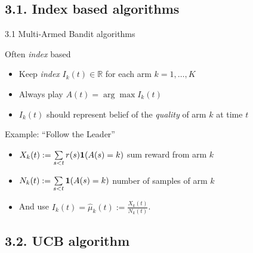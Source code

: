 \documentclass[12pt,english,ignorenonframetext,]{beamer}
\providecommand{\tightlist}{%
  \setlength{\itemsep}{0pt}\setlength{\parskip}{0pt}}
\begin{document}
\subsection{\hfill{}3.1.  Index based algorithms\hfill{}}

\begin{frame}{%
\protect\hypertarget{multi-armed-bandit-algorithms}{%
3.1 Multi-Armed Bandit algorithms}}

\begin{block}{Often \emph{index} based}

\begin{itemize}
\tightlist
\item
  Keep \emph{index} \(I_k(t) \in \mathbb{R}\) for each arm
  \(k=1,\ldots,K\)
\item
  Always play \(A(t) = \arg\max I_k(t)\)
\item
  \(I_k(t)\) should represent belief of the \emph{quality} of arm
  \(k\) at time \(t\)
\end{itemize}

\end{block}

\begin{block}{Example: ``Follow the Leader''}

\begin{itemize}
\tightlist
\item
  \(X_k(t) := \sum\limits_{s < t} r(s) \bold{1}(A(s)=k)\) sum reward
  from arm \(k\)
\item
  \(N_k(t) := \sum\limits_{s < t} \bold{1}(A(s)=k)\) number of samples
  of arm \(k\)
\item
  And use \(I_k(t) = \hat{\mu}_k(t) := \frac{X_k(t)}{N_k(t)}\).
\end{itemize}

\end{block}

\end{frame}



\subsection{\hfill{}3.2. UCB algorithm \hfill{}}
\end{document}
